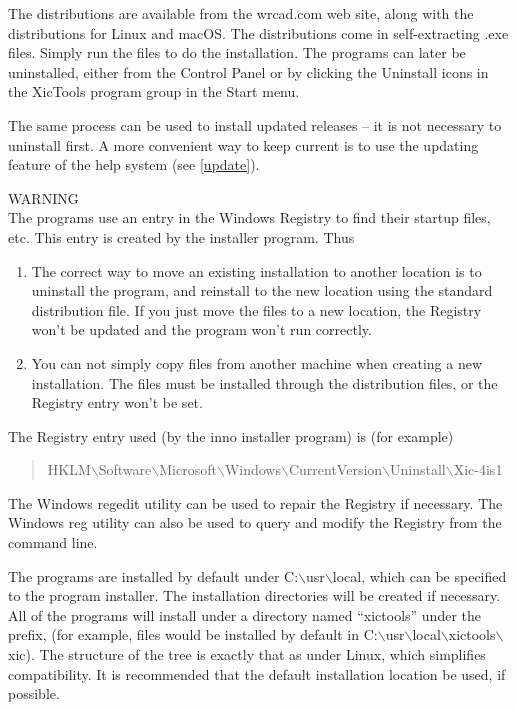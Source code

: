 \begin{itemize}
The distributions are available from the {\vt wrcad.com} web site,
along with the distributions for Linux and macOS.  The distributions
come in self-extracting {\vt .exe} files.  Simply run the files to do
the installation.  The programs can later be uninstalled, either from
the {\cb Control Panel} or by clicking the {\cb Uninstall} icons in
the {\cb XicTools} program group in the {\cb Start} menu.

The same process can be used to install updated releases -- it is not
necessary to uninstall first.  A more convenient way to keep current
is to use the updating feature of the help system (see \ref{update}).

WARNING\\
The programs use an entry in the Windows Registry to find their
startup files, etc.  This entry is created by the installer program. 
Thus
\begin{enumerate}
\item{The correct way to move an existing installation to another
location is to uninstall the program, and reinstall to the new
location using the standard distribution file.  If you just move the
files to a new location, the Registry won't be updated and the program
won't run correctly.}

\item{You can not simply copy files from another machine when creating
a new installation.  The files must be installed through the
distribution files, or the Registry entry won't be set.}
\end{enumerate}

The Registry entry used (by the {\vt inno} installer program) is
(for example)
\begin{quote}\vt
HKLM$\backslash$Software$\backslash$Microsoft$\backslash$Windows$\backslash$CurrentVersion$\backslash$Uninstall$\backslash$Xic-4is1
\end{quote}

The Windows {\vt regedit} utility can be used to repair the Registry
if necessary.  The Windows {\vt reg} utility can also be used to query
and modify the Registry from the command line.

The programs are installed by default under {\vt
C:{$\backslash$}usr{$\backslash$}local}, which can be specified to the
program installer.  The installation directories will be created if
necessary.  All of the programs will install under a directory named
``{\vt xictools}'' under the prefix, (for example, {\Xic} files would
be installed by default in {\vt
C:$\backslash$usr$\backslash$local$\backslash$xictools$\backslash$xic}). 
The structure of the tree is exactly that as under Linux, which
simplifies compatibility.  It is recommended that the default
installation location be used, if possible.


\end{itemize}
